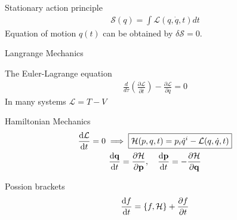 \documentclass{article}
\begin{document}
\begin{multicols}{2}

Stationary action principle
\begin{gather}
    \mathcal{S}(q) = \int \mathcal{L}(q,\dot{q},t) dt
\end{gather}
Equation of motion $q(t)$ can be obtained by $\delta \mathcal{S} = 0$.

Langrange Mechanics

The Euler-Lagrange equation
\begin{gather}
    \boxed{
        \frac{d}{d\tau}\left(\frac{\partial \mathcal{L}}{\partial \dot t}\right) - \frac{\partial \mathcal{L}}{\partial q} = 0
    }
\end{gather}
In many systems $\mathcal{L} = T - V$

Hamiltonian Mechanics
\begin{gather}
    \dv{\mathcal{L}}{t} = 0 \implies \boxed{\mathcal{H}(p,q,t) = p_i\dot{q}^i - \mathcal{L}(q,\dot{q},t)}\\
    \dv{\vb{q}}{t} = \pdv{\mathcal{H}}{\vb{p}}, \quad \dv{\vb{p}}{t} = -\pdv{\mathcal{H}}{\vb{q}}
\end{gather}

Possion brackets
\begin{gather}
    \dv{f}{t} = \poissonbracket{f}{\mathcal{H}} + \pdv{f}{t}
\end{gather}


\end{multicols}
\end{document}
